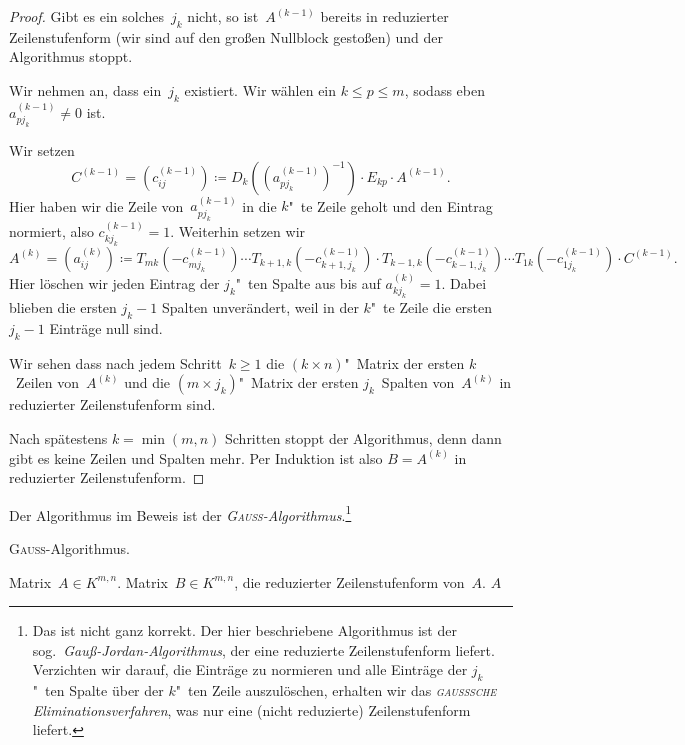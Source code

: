 \documentclass[a4paper]{article}
\begin{document}
\begin{proof}
    Gibt es ein solches~$j_k$ nicht, so ist~$A^{(k-1)}$ bereits in reduzierter Zeilenstufenform (wir sind auf den großen Nullblock gestoßen) und der Algorithmus stoppt.

    Wir nehmen an, dass ein~$j_k$ existiert. Wir wählen ein $k \leq p \leq m$, sodass eben $a_{pj_k}^{(k-1)} \neq 0$ ist.

    Wir setzen
    \begin{equation*}
        C^{(k-1)} = (c_{ij}^{(k-1)}) \coloneqq D_k((a_{pj_k}^{(k-1)})^{-1}) \cdot E_{kp} \cdot A^{(k-1)}.
    \end{equation*}
    Hier haben wir die Zeile von~$a_{pj_k}^{(k-1)}$ in die $k$"~te Zeile geholt und den Eintrag normiert, also $c_{kj_k}^{(k-1)} = 1$. Weiterhin setzen wir
    \begin{equation*}
        A^{(k)} = (a_{ij}^{(k)}) \coloneqq T_{mk}(-c_{mj_k}^{(k-1)}) \cdots T_{k+1,k}(-c_{k+1,j_k}^{(k-1)}) \cdot T_{k-1,k}(-c_{k-1,j_k}^{(k-1)}) \cdots T_{1k}(-c_{1j_k}^{(k-1)}) \cdot C^{(k-1)}.
    \end{equation*}
    Hier löschen wir jeden Eintrag der $j_k$"~ten Spalte aus bis auf $a_{kj_k}^{(k)} = 1$. Dabei blieben die ersten $j_k-1$ Spalten unverändert, weil in der $k$"~te Zeile die ersten $j_k-1$ Einträge null sind.

    Wir sehen dass nach jedem Schritt~$k \geq 1$ die $(k\times n)$"~Matrix der ersten $k$~Zeilen von~$A^{(k)}$ und die $(m\times j_k)$"~Matrix der ersten $j_k$~Spalten von~$A^{(k)}$ in reduzierter Zeilenstufenform sind.

    Nach spätestens $k = \min(m,n)$ Schritten stoppt der Algorithmus, denn dann gibt es keine Zeilen und Spalten mehr. Per Induktion ist also $B = A^{(k)}$ in reduzierter Zeilenstufenform.
\end{proof}

Der Algorithmus im Beweis ist der \emph{\textsc{Gauß}-Algorithmus}.\footnote{Das ist nicht ganz korrekt. Der hier beschriebene Algorithmus ist der sog.\ \emph{\emph{Gauß}-\emph{Jordan}-Algorithmus}, der eine reduzierte Zeilenstufenform liefert. Verzichten wir darauf, die Einträge zu normieren und alle Einträge der $j_k$"~ten Spalte über der $k$"~ten Zeile auszulöschen, erhalten wir das \emph{\textsc{gaußsche} Eliminationsverfahren}, was nur eine (nicht reduzierte) Zeilenstufenform liefert.}

\begin{algorithm}
    \caption{\textsc{Gauß}-Algorithmus.}
    \begin{algorithmic}[1]
        \Require Matrix~$A \in K^{m,n}$.
        \Ensure Matrix~$B \in K^{m,n}$, die reduzierter Zeilenstufenform von~$A$.
        \State{}
        \State\Return $A$
        \EndIf
    \end{algorithmic}
\end{algorithm}
\end{document}
